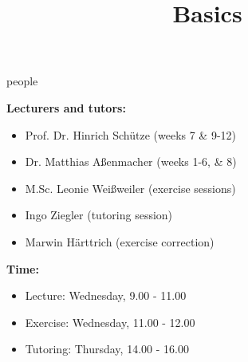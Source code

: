 


\newcommand*\POS[1]{\textsubscript{\texttt{#1}}} %
\usepackage{qtree} %

\newcommand{\learninggoals}{
\item Understand the scope of the course
\item Answers to all open question
\item Get an impression of the workload}

\title{Basics}
\date{}




\begin{vbframe}{people}

\vfill

\textbf{Lecturers and tutors:}

	\begin{itemize}
		\item Prof. Dr. Hinrich Schütze (weeks 7 \& 9-12)
		\item Dr. Matthias Aßenmacher (weeks 1-6, \& 8)
		\item M.Sc. Leonie Weißweiler (exercise sessions)
		\item Ingo Ziegler (tutoring session)
		\item Marwin Härttrich (exercise correction)
	\end{itemize}

\textbf{Time:}

	\begin{itemize}
		\item Lecture: Wednesday, 9.00 - 11.00
		\item Exercise: Wednesday, 11.00 - 12.00
		\item Tutoring: Thursday, 14.00 - 16.00
	\end{itemize}

\vfill

\end{vbframe}



